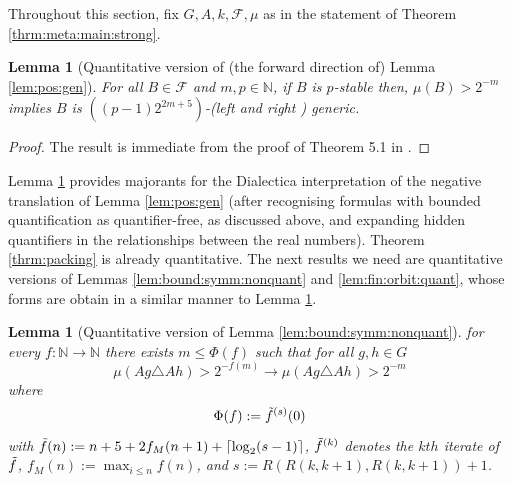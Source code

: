 \documentclass[11pt]{amsart}
\newtheorem{lemma}[theorem]{Lemma}
\theoremstyle{definition}
\theoremstyle{remark}
\def\NN{\mathbb{N}}
\begin{document}
Throughout this section, fix $G,A,k, \mathcal{F}, \mu$ as in the statement of Theorem \ref{thrm:meta:main:strong}.
\begin{lemma}[Quantitative version of (the forward direction of) Lemma \ref{lem:pos:gen}]
\label{lem:pos:gen:quant}
    For all $B\in \mathcal{F}$ and $m,p \in \NN$, if $B$ is $p$-stable then, $\mu(B) > 2^{-m}$ implies $B$ is $((p-1)2^{2m+5})$-(left and right ) generic.
\end{lemma}
\begin{proof}
    The result is immediate from the proof of Theorem 5.1 in \cite{conant2021quantitative}.
\end{proof}
Lemma \ref{lem:pos:gen:quant} provides  majorants for the Dialectica interpretation of the negative translation of Lemma \ref{lem:pos:gen} (after recognising formulas with bounded quantification as quantifier-free, as discussed above, and expanding hidden quantifiers in the relationships between the real numbers). Theorem \ref{thrm:packing} is already quantitative. The next results we need are quantitative versions of Lemmas \ref{lem:bound:symm:nonquant} and \ref{lem:fin:orbit:quant}, whose forms are obtain in a similar manner to Lemma \ref{lem:pos:gen:quant}. 
\begin{lemma}[Quantitative version of Lemma \ref{lem:bound:symm:nonquant}]
\label{lem:bound:symm:quant}
    for every $f :\NN \to \NN$ there exists $m \le \Phi(f)$ such that for all $g, h \in G$
        \[
    \mu(Ag \triangle Ah) > 2^{-f(m)} \to \mu(Ag \triangle Ah)>2^{-m}
    \]
    where 
    \[
    \Phi(f):= \Tilde{f}^{(s)}(0)
    \]
    with $\Tilde{f}(n):= n+5 +2f_M(n+1)+\lceil \log_2(s-1)\rceil$, $\Tilde{f}^{(k)}$ denotes the $kth$ iterate of $\Tilde{f}$, $f_M(n):= \max_{i\le n}f(n)$, and $s:= R(R(k, k + 1), R(k, k + 1))+ 1$.
\end{lemma}
\end{document}
